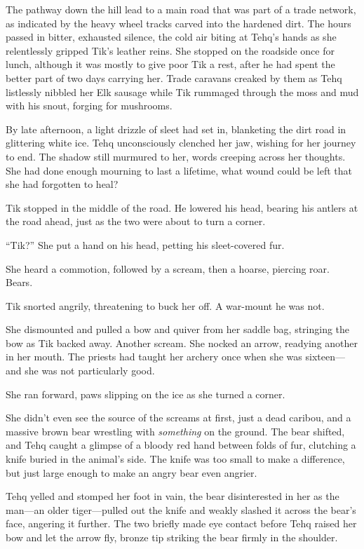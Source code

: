 The pathway down the hill lead to a main road that was part of a trade network, as indicated by the heavy wheel tracks carved into the hardened dirt. The hours passed in bitter, exhausted silence, the cold air biting at Tehq's hands as she relentlessly gripped Tik's leather reins. She stopped on the roadside once for lunch, although it was mostly to give poor Tik a rest, after he had spent the better part of two days carrying her. Trade caravans creaked by them as Tehq listlessly nibbled her Elk sausage while Tik rummaged through the moss and mud with his snout, forging for mushrooms.

By late afternoon, a light drizzle of sleet had set in, blanketing the dirt road in glittering white ice. Tehq unconsciously clenched her jaw, wishing for her journey to end. The shadow still murmured to her, words creeping across her thoughts. She had done enough mourning to last a lifetime, what wound could be left that she had forgotten to heal?

Tik stopped in the middle of the road. He lowered his head, bearing his antlers at the road ahead, just as the two were about to turn a corner.

``Tik?'' She put a hand on his head, petting his sleet-covered fur.

She heard a commotion, followed by a scream, then a hoarse, piercing roar. Bears.

Tik snorted angrily, threatening to buck her off. A war-mount he was not.

She dismounted and pulled a bow and quiver from her saddle bag, stringing the bow as Tik backed away. Another scream. She nocked an arrow, readying another in her mouth. The priests had taught her archery once when she was sixteen---and she was not particularly good.

She ran forward, paws slipping on the ice as she turned a corner.

She didn't even see the source of the screams at first, just a dead caribou, and a massive brown bear wrestling with \emph{something} on the ground. The bear shifted, and Tehq caught a glimpse of a bloody red hand between folds of fur, clutching a knife buried in the animal's side. The knife was too small to make a difference, but just large enough to make an angry bear even angrier.

Tehq yelled and stomped her foot in vain, the bear disinterested in her as the man---an older tiger---pulled out the knife and weakly slashed it across the bear's face, angering it further. The two briefly made eye contact before Tehq raised her bow and let the arrow fly, bronze tip striking the bear firmly in the shoulder.

